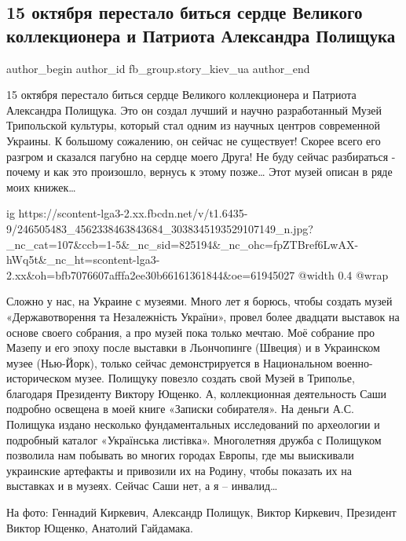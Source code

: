  
 
 
 
 
 
\subsection{15 октября перестало биться сердце Великого коллекционера и Патриота Александра Полищука}
\label{sec:17_10_2021.fb.fb_group.story_kiev_ua.2.aleksandr_polischuk}
 
\ifcmt
 author_begin
   author_id fb_group.story_kiev_ua
 author_end
\fi

15 октября перестало биться сердце Великого коллекционера и Патриота Александра
Полищука. Это он создал лучший и научно разработанный Музей Трипольской
культуры, который стал одним из научных центров современной Украины. К большому
сожалению, он сейчас не существует! Скорее всего его разгром и сказался пагубно
на сердце моего Друга! Не буду сейчас разбираться - почему и как это произошло,
вернусь к этому позже… Этот музей описан в ряде моих книжек… 

\ifcmt
  ig https://scontent-lga3-2.xx.fbcdn.net/v/t1.6435-9/246505483_4562338463843684_3038345193529107149_n.jpg?_nc_cat=107&ccb=1-5&_nc_sid=825194&_nc_ohc=fpZTBref6LwAX-hWq5t&_nc_ht=scontent-lga3-2.xx&oh=bfb7076607afffa2ee30b66161361844&oe=61945027
  @width 0.4
  @wrap 
\fi

Сложно у нас, на
Украине с музеями. Много лет я борюсь, чтобы создать музей «Державотворення та
Незалежність України», провел более двадцати выставок на основе своего
собрания, а про музей пока только мечтаю. Моё собрание про Мазепу и его эпоху
после выставки в Льончопинге (Швеция) и в Украинском музее (Нью-Йорк), только
сейчас демонстрируется в Национальном военно-историческом музее. Полищуку
повезло создать свой Музей в Триполье, благодаря Президенту Виктору Ющенко. А,
коллекционная деятельность Саши подробно освещена в моей книге «Записки
собирателя». На деньги А.С. Полищука издано несколько фундаментальных
исследований по археологии и подробный каталог «Українська листівка».
Многолетняя дружба с Полищуком позволила нам побывать во многих городах Европы,
где мы выискивали украинские артефакты и привозили их на Родину, чтобы показать
их на выставках и в музеях. Сейчас Саши нет, а я – инвалид…

На фото: Геннадий Киркевич, Александр Полищук, Виктор Киркевич, Президент
Виктор Ющенко, Анатолий Гайдамака.
